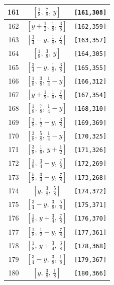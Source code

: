 \documentclass[fleqn,8pt]{jsarticle}
\begin{document}
\begin{longtable}{ccc}
161 & $\left[ \frac{1}{8},\, \frac{7}{8},\, y \right]$ & {\tt [161,308]} \\ \hline
162 & $\left[ y + \frac{1}{2},\, \frac{1}{8},\, \frac{3}{8} \right]$ & {\tt [162,359]} \\ \hline
163 & $\left[ \frac{3}{4} - y,\, \frac{1}{8},\, \frac{7}{8} \right]$ & {\tt [163,357]} \\ \hline
164 & $\left[ \frac{1}{8},\, \frac{3}{8},\, y \right]$ & {\tt [164,305]} \\ \hline
165 & $\left[ \frac{3}{4} - y,\, \frac{1}{8},\, \frac{3}{8} \right]$ & {\tt [165,355]} \\ \hline
166 & $\left[ \frac{1}{8},\, \frac{3}{8},\, \frac{1}{4} - y \right]$ & {\tt [166,312]} \\ \hline
167 & $\left[ y + \frac{1}{2},\, \frac{1}{8},\, \frac{7}{8} \right]$ & {\tt [167,354]} \\ \hline
168 & $\left[ \frac{1}{8},\, \frac{7}{8},\, \frac{1}{4} - y \right]$ & {\tt [168,310]} \\ \hline
169 & $\left[ \frac{1}{8},\, \frac{1}{2} - y,\, \frac{3}{8} \right]$ & {\tt [169,369]} \\ \hline
170 & $\left[ \frac{3}{8},\, \frac{5}{8},\, \frac{1}{4} - y \right]$ & {\tt [170,325]} \\ \hline
171 & $\left[ \frac{3}{8},\, \frac{1}{8},\, y + \frac{1}{2} \right]$ & {\tt [171,326]} \\ \hline
172 & $\left[ \frac{1}{8},\, \frac{3}{4} - y,\, \frac{7}{8} \right]$ & {\tt [172,269]} \\ \hline
173 & $\left[ \frac{5}{8},\, \frac{3}{4} - y,\, \frac{7}{8} \right]$ & {\tt [173,268]} \\ \hline
174 & $\left[ y,\, \frac{3}{8},\, \frac{5}{8} \right]$ & {\tt [174,372]} \\ \hline
175 & $\left[ \frac{3}{4} - y,\, \frac{3}{8},\, \frac{5}{8} \right]$ & {\tt [175,371]} \\ \hline
176 & $\left[ \frac{1}{8},\, y + \frac{3}{4},\, \frac{7}{8} \right]$ & {\tt [176,370]} \\ \hline
177 & $\left[ \frac{1}{8},\, \frac{1}{2} - y,\, \frac{7}{8} \right]$ & {\tt [177,361]} \\ \hline
178 & $\left[ \frac{1}{8},\, y + \frac{3}{4},\, \frac{3}{8} \right]$ & {\tt [178,368]} \\ \hline
179 & $\left[ \frac{3}{4} - y,\, \frac{3}{8},\, \frac{1}{8} \right]$ & {\tt [179,367]} \\ \hline
180 & $\left[ y,\, \frac{3}{8},\, \frac{1}{8} \right]$ & {\tt [180,366]} \\ \hline

\end{longtable}
\end{document}
